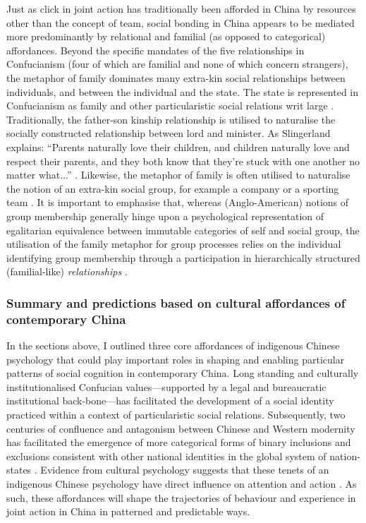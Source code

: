 \begin{CJK}{UTF8}{gbsn}
Just as click in joint action has traditionally been afforded in China by resources other than the concept of team, social bonding in China appears to be mediated more predominantly by relational and familial (as opposed to categorical) affordances.  Beyond the specific mandates of the five relationships in Confucianism (four of which are familial and none of which concern strangers), the metaphor of family dominates many extra-kin social relationships between individuals, and between the individual and the state.  The state is represented in Confucianism as family and other particularistic social relations writ large \citep[579]{Liu2009}.  Traditionally, the father-son kinship relationship is utilised to naturalise the socially constructed relationship between lord and minister.  As Slingerland explains: ``Parents naturally love their children, and children naturally love and respect their parents, and they both know that they're stuck with one another no matter what...'' \citep[178]{Slingerland2014}. Likewise, the metaphor of family is often utilised to naturalise the notion of an extra-kin social group, for example a company or a sporting team \citep{Brownell2008}.
It is important to emphasise that, whereas (Anglo-American) notions of group membership generally hinge upon a psychological representation of egalitarian equivalence between immutable categories of self and social group, the utilisation of the family metaphor for group processes relies on the individual identifying group membership through a participation in hierarchically structured (familial-like) \textit{relationships} \citep{Fei1992}.


\subsubsection{Summary and predictions based on cultural affordances of contemporary China}
In the sections above, I outlined three core affordances of indigenous Chinese psychology that could play important roles in shaping and enabling particular patterns of social cognition in contemporary China.  Long standing and culturally institutionalised Confucian values---supported by a legal and bureaucratic institutional back-bone---has facilitated the development of a social identity practiced within a context of particularistic social relations.  Subsequently, two centuries of confluence and antagonism between Chinese and Western modernity has facilitated the emergence of more categorical forms of binary inclusions and exclusions consistent with other national identities in the global system of nation-states \citep{Liu2009}.  Evidence from cultural psychology suggests that these tenets of an indigenous Chinese psychology have direct influence on attention and action \citep{Nisbett2001}.  As such, these affordances will shape the trajectories of behaviour and experience in joint action in China in patterned and predictable ways.


\end{CJK}
